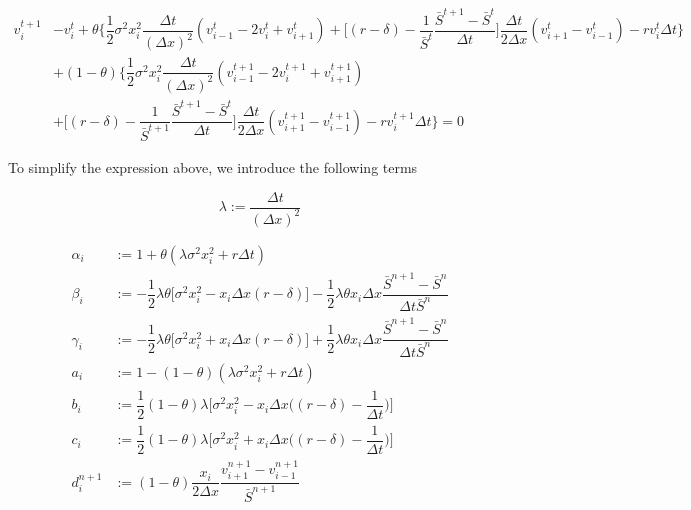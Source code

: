 \begin{equation}
    \begin{split}
        v^{t+1}_{i} &- v^{t}_{i} + \theta \bigg\{ \dfrac{1}{2}\sigma^2 x^{2}_{i} \dfrac{\Delta t}{(\Delta x)^2} (v^{t}_{i-1} - 2 v^{t}_{i} + v^{t}_{i+1}) + \bigg[ (r - \delta) - \dfrac{1}{\bar{S}^t} \dfrac{\bar{S}^{t+1} - \bar{S}^{t}}{\Delta t} \bigg] \dfrac{\Delta t}{2\Delta x} (v_{i+1}^{t} - v_{i-1}^{t}) - r v^{t}_{i} \Delta t \bigg\}
        \\ & + (1-\theta) \bigg\{ \dfrac{1}{2}\sigma^2 x^{2}_{i} \dfrac{\Delta t}{(\Delta x)^2}(v^{t+1}_{i-1} - 2 v^{t+1}_{i} + v^{t+1}_{i+1}) 
        \\ &  + \bigg[ (r - \delta) - \dfrac{1}{\bar{S}^{t+1}} \dfrac{\bar{S}^{t+1} - \bar{S}^{t}}{\Delta t} \bigg]\dfrac{\Delta t}{2\Delta x}(v_{i+1}^{t+1} - v_{i-1}^{t+1}) - r v^{t+1}_{i} \Delta t \bigg\} = 0
    \end{split}
\end{equation}

To simplify the expression above, we introduce the following terms

\begin{equation}
    \lambda := \dfrac{\Delta t}{(\Delta x)^2}
\end{equation}

\begin{align}
    \alpha_i &:= 1 + \theta (\lambda \sigma^2 x_{i}^{2} + r{\Delta t}) \\
    \beta_i &:= - \dfrac{1}{2} \lambda \theta \bigg[ \sigma^{2} x_{i}^{2} - x_i \Delta x (r - \delta) \bigg]  - \dfrac{1}{2} \lambda \theta   x_i \Delta x \dfrac{\bar{S}^{n+1} - \bar{S}^{n}}{\Delta t \bar{S}^n}  \\
    \gamma_i &:= -\dfrac{1}{2} \lambda \theta \bigg[ \sigma^{2} x_{i}^{2} + x_i \Delta x (r - \delta) \bigg]  + \dfrac{1}{2} \lambda \theta  x_i \Delta x  \dfrac{\bar{S}^{n+1} - \bar{S}^{n}}{\Delta t \bar{S}^n}\\
    a_i &:= 1 - (1-\theta) (\lambda \sigma^2 x_{i}^{2} +  r{\Delta t}) \\
    b_i &:= \dfrac{1}{2} (1-\theta) \lambda \bigg[\sigma^{2} x_{i}^{2} - x_i \Delta x \bigg( (r - \delta) - \dfrac{1}{\Delta t} \bigg) \bigg] \\
    c_i &:= \dfrac{1}{2} (1-\theta) \lambda \bigg[ \sigma^{2} x_{i}^{2} +  x_i \Delta x \bigg( (r - \delta) - \dfrac{1}{\Delta t} \bigg) \bigg] \\
    d^{n+1}_i &:= (1-\theta) \dfrac{x_i}{2 \Delta x}  \dfrac{v^{n+1}_{i+1} - v^{n+1}_{i-1}}{\bar{S}^{n+1}}
\end{align}

